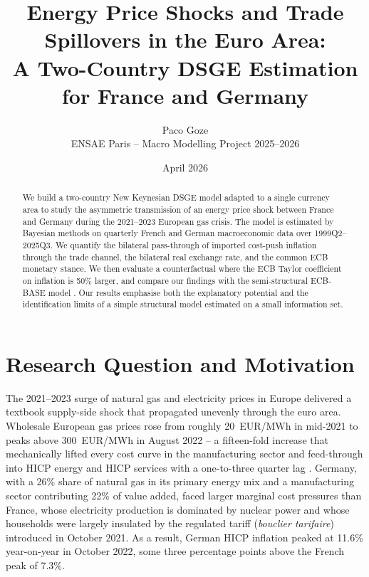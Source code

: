 \documentclass[11pt,a4paper]{article}
\title{\vspace{-1.6cm}\textbf{Energy Price Shocks and Trade Spillovers in the Euro Area:\\
A Two-Country DSGE Estimation for France and Germany}}
\author{Paco Goze \\
        \small ENSAE Paris -- Macro Modelling Project 2025--2026}
\date{April 2026}
\begin{document}
\maketitle
\vspace{-1.0em}

\begin{abstract}\noindent\small
We build a two-country New Keynesian DSGE model adapted to a single
currency area to study the asymmetric transmission of an energy
price shock between France and Germany during the 2021--2023 European
gas crisis. The model is estimated by Bayesian methods on quarterly
French and German macroeconomic data over 1999Q2--2025Q3. We
quantify the bilateral pass-through of imported cost-push inflation
through the trade channel, the bilateral real exchange rate, and the
common ECB monetary stance. We then evaluate a counterfactual where
the ECB Taylor coefficient on inflation is 50\% larger, and compare
our findings with the semi-structural ECB-BASE model
\citep{ECBBASE2019}. Our results emphasise both the explanatory
potential and the identification limits of a simple structural model
estimated on a small information set.
\end{abstract}

\section{Research Question and Motivation}
The 2021--2023 surge of natural gas and electricity prices in Europe
delivered a textbook supply-side shock that propagated unevenly
through the euro area. Wholesale European gas prices rose from
roughly 20~EUR/MWh in mid-2021 to peaks above 300~EUR/MWh in
August 2022 -- a fifteen-fold increase that mechanically lifted
every cost curve in the manufacturing sector and feed-through into
HICP energy and HICP services with a one-to-three quarter lag
\citep{ECBBASE2019}. Germany, with a 26\% share of natural gas in
its primary energy mix and a manufacturing sector contributing 22\%
of value added, faced larger marginal cost pressures than France,
whose electricity production is dominated by nuclear power and whose
households were largely insulated by the regulated tariff
(\emph{bouclier tarifaire}) introduced in October 2021. As a result,
German HICP inflation peaked at 11.6\% year-on-year in October 2022,
some three percentage points above the French peak of 7.3\%.
\end{document}
